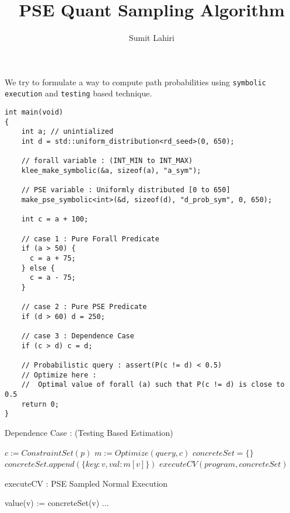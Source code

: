 \documentclass{article}
\title{PSE Quant Sampling Algorithm}
\author{Sumit Lahiri}
\begin{document}
	\maketitle
	
We try to formulate a way to compute path probabilities using \texttt{symbolic execution} and \texttt{testing} based technique.  
\begin{verbatim} 
int main(void)
{
	int a; // unintialized
	int d = std::uniform_distribution<rd_seed>(0, 650);
	
	// forall variable : (INT_MIN to INT_MAX)
	klee_make_symbolic(&a, sizeof(a), "a_sym");
	
	// PSE variable : Uniformly distributed [0 to 650]
	make_pse_symbolic<int>(&d, sizeof(d), "d_prob_sym", 0, 650);
	
	int c = a + 100;
	
	// case 1 : Pure Forall Predicate
	if (a > 50) {
	  c = a + 75;
	} else {
	  c = a - 75;
	}
	
	// case 2 : Pure PSE Predicate
	if (d > 60) d = 250;
	
	// case 3 : Dependence Case
	if (c > d) c = d;

	// Probabilistic query : assert(P(c != d) < 0.5)
	// Optimize here : 
	//	Optimal value of forall (a) such that P(c != d) is close to 0.5 	
	return 0;
}
\end{verbatim}

\begin{algorithm}[H]
    \caption{Dependence Case : (Testing Based Estimation)}
    \begin{algorithmic}[1]
        \State $c := ConstraintSet(p)$ 
        \State $m := Optimize(query,  c)$ 
        \State $concreteSet = \{ \}$
        	\State $concreteSet.append(\{key : v, val : m[v]\})$ 
        	\EndForEach
        \State $executeCV(program, concreteSet)$
        \EndForEach
    \end{algorithmic}
\end{algorithm}

\begin{algorithm}[H]
	\caption{executeCV : PSE Sampled Normal Execution}
	\begin{algorithmic}[1]
			\State value(v) := concreteSet(v) 
			\EndForEach
			\State ... 
		\EndFunction
	\end{algorithmic}
\end{algorithm}
\end{document}
